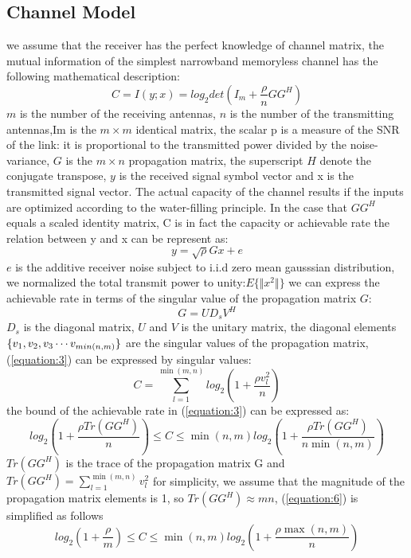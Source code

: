 \documentclass[conference]{IEEEtran}
\begin{document}
\subsection{Channel Model}
we assume that the receiver has the perfect knowledge of channel matrix, the mutual information of the simplest narrowband memoryless channel has the following mathematical description:
\begin{equation}
C=I(y;x)=log_2det(I_m +\frac{\rho}{n}GG^H ) \label{equation:3}
\end{equation}
$m$ is the number of the receiving antennas, $n$ is the number of the transmitting antennas,Im is the $m\times m$ identical matrix, the scalar p is a measure of the SNR of the link: it is proportional to the transmitted power divided by the noise-variance, $G$ is the $m\times n$ propagation matrix, the superscript $H$ denote the conjugate transpose, $y$ is the received signal symbol vector and x is the transmitted signal vector. The actual capacity of the
channel results if the inputs are optimized according to the water-filling principle. In the case that $GG^H$ equals a scaled identity matrix, C is in fact the capacity or achievable rate
the relation between y and x can be represent as:
\begin{equation}
y=\sqrt{\rho}Gx+e  \label{equation:4}
\end{equation}
$e$ is the additive receiver noise subject to i.i.d zero mean gausssian distribution, we normalized the total transmit power to unity:$E\{\Vert x^2\Vert\}$ 
we can express the achievable rate in terms of the singular value of the propagation matrix $G$:
\begin{equation}
G=UD_sV^H \label{equation:5}
\end{equation}
$D_s$ is the diagonal matrix, $U$ and $V$ is the unitary matrix, the diagonal elements $\{v_1,v_2,v_3\newline\cdots v_{min(n,m)}\}$ are the singular values of the propagation matrix, (\ref{equation:3}) can be expressed by singular values:
\begin{equation}
C=\sum_{l=1}^{\min(m,n)}log_2(1+\frac{\rho v_l^2}{n})
\end{equation} 
the bound of the achievable rate in (\ref{equation:3}) can be expressed as:
\begin{equation}
log_2(1+\frac{\rho Tr(GG^H)}{n})\leq C\leq\min(n,m)log_2(1+\frac{\rho Tr(GG^H)}{n\min(n,m)})\label{equation:6}
\end{equation}
$Tr(GG^H)$ is the trace of the propagation matrix G and $Tr(GG^H)=\sum_{l=1}^{\min(m,n)}v_l^2$ for simplicity, we assume that the magnitude of the propagation matrix elements is 1, so $Tr(GG^H)\approx mn$, (\ref{equation:6}) is simplified as follows
\begin{equation}
log_2(1+\frac{\rho}{m})\leq C\leq\min(n,m)log_2(1+\frac{\rho\max(n,m)}{n}) \label{equation:7}
\end{equation}\newline
\end{document}
